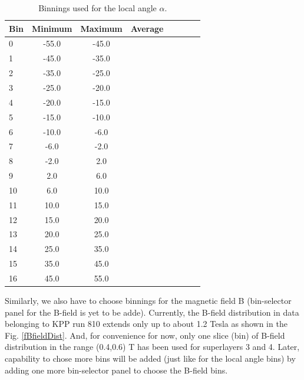 \documentclass[12pt]{article}
\begin{document}
\begin{table}%
\centering
\begin{tabular}{l*{6}{c}r}

Bin         & Minimum    & Maximum   & Average\\
\hline
0                 & -55.0    &  -45.0     \\
1                 & -45.0    &  -35.0     \\
2                 & -35.0    &  -25.0     \\
3                 & -25.0    &  -20.0     \\
4                 & -20.0    &  -15.0     \\
5                 & -15.0    &  -10.0     \\
6                 & -10.0    &  -6.0       \\
7                 & -6.0      &  -2.0       \\
8                 & -2.0      &   2.0       \\
9                 &  2.0      &   6.0       \\
10               &  6.0      &   10.0     \\
11               &  10.0    &  15.0       \\
12               &  15.0    &  20.0       \\
13               &  20.0    &  25.0       \\
14               &  25.0    &  35.0       \\
15               &  35.0    &  45.0       \\
16               &  45.0    &   55.0       \\

\hline
\end{tabular}
\caption{Binnings used for the local angle $\alpha$.}   \label{tabParLimits}
\label{tAngleBins}
\end{table}

Similarly, we also have to choose binnings for the magnetic field B (bin-selector panel for the B-field is yet to be adde). Currently, the B-field distribution in data belonging to KPP run 810 extends only up to about 1.2 Tesla as shown in the Fig. \ref{fBfieldDist}. And, for convenience for now, only one slice (bin) of B-field distribution in the range (0.4,0.6) T has been used for superlayers 3 and 4. Later, capability to chose more bins will be added (just like for the local angle bins) by adding one more bin-selector panel to choose the B-field bins.
\end{document}

